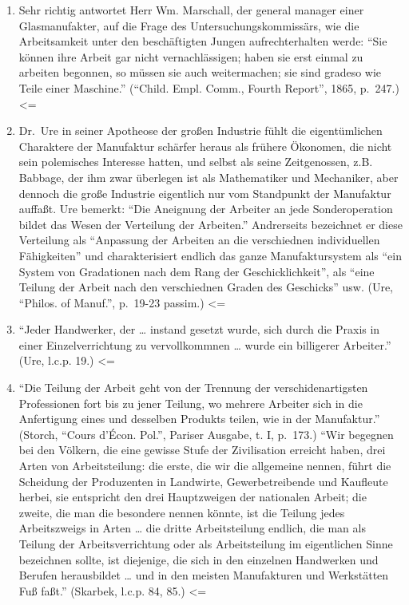 {\begin{enumerate}
  \textless{}=
\item
  Sehr richtig antwortet Herr Wm. Marschall, der general manager einer
  Glasmanufakter, auf die Frage des Untersuchungskommissärs, wie die
  Arbeitsamkeit unter den beschäftigten Jungen aufrechterhalten werde:
  ``Sie können ihre Arbeit gar nicht vernachlässigen; haben sie erst
  einmal zu arbeiten begonnen, so müssen sie auch weitermachen; sie sind
  gradeso wie Teile einer Maschine.'' (``Child. Empl. Comm., Fourth
  Report'', 1865, p.~247.) \textless{}=
\item
  Dr.~Ure in seiner Apotheose der großen Industrie fühlt die
  eigentümlichen Charaktere der Manufaktur schärfer heraus als frühere
  Ökonomen, die nicht sein polemisches Interesse hatten, und selbst als
  seine Zeitgenossen, z.B. Babbage, der ihm zwar überlegen ist als
  Mathematiker und Mechaniker, aber dennoch die große Industrie
  eigentlich nur vom Standpunkt der Manufaktur auffaßt. Ure bemerkt:
  ``Die Aneignung der Arbeiter an jede Sonderoperation bildet das Wesen
  der Verteilung der Arbeiten.'' Andrerseits bezeichnet er diese
  Verteilung als ``Anpassung der Arbeiten an die verschiednen
  individuellen Fähigkeiten'' und charakterisiert endlich das ganze
  Manufaktursystem als ``ein System von Gradationen nach dem Rang der
  Geschicklichkeit'', als ``eine Teilung der Arbeit nach den
  verschiednen Graden des Geschicks'' usw. (Ure, ``Philos. of Manuf.'',
  p.~19-23 passim.) \textless{}=
\item
  ``Jeder Handwerker, der \ldots{} instand gesetzt wurde, sich durch die
  Praxis in einer Einzelverrichtung zu vervollkommnen \ldots{} wurde ein
  billigerer Arbeiter.'' (Ure, l.c.p. 19.) \textless{}=
\item
  ``Die Teilung der Arbeit geht von der Trennung der verschidenartigsten
  Professionen fort bis zu jener Teilung, wo mehrere Arbeiter sich in
  die Anfertigung eines und desselben Produkts teilen, wie in der
  Manufaktur.'' (Storch, ``Cours d'Écon. Pol.'', Pariser Ausgabe, t. I,
  p.~173.) ``Wir begegnen bei den Völkern, die eine gewisse Stufe der
  Zivilisation erreicht haben, drei Arten von Arbeitsteilung: die erste,
  die wir die allgemeine nennen, führt die Scheidung der Produzenten in
  Landwirte, Gewerbetreibende und Kaufleute herbei, sie entspricht den
  drei Hauptzweigen der nationalen Arbeit; die zweite, die man die
  besondere nennen könnte, ist die Teilung jedes Arbeitszweigs in Arten
  \ldots{} die dritte Arbeitsteilung endlich, die man als Teilung der
  Arbeitsverrichtung oder als Arbeitsteilung im eigentlichen Sinne
  bezeichnen sollte, ist diejenige, die sich in den einzelnen Handwerken
  und Berufen herausbildet \ldots{} und in den meisten Manufakturen und
  Werkstätten Fuß faßt.'' (Skarbek, l.c.p. 84, 85.) \textless{}=
\end{enumerate}

}
